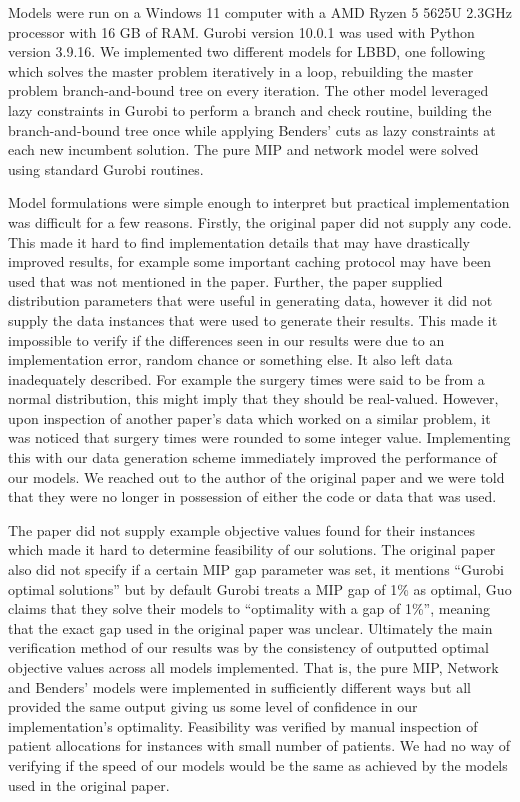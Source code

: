 Models were run on a Windows 11 computer with a AMD Ryzen 5 5625U 2.3GHz processor with 16 GB of RAM\@. Gurobi version 10.0.1 was used with Python version 3.9.16. We implemented two different models for LBBD, one following\cite{roshanaei2017propagating} which solves the master problem iteratively in a loop, rebuilding the master problem branch-and-bound tree on every iteration. The other model leveraged lazy constraints in Gurobi to perform a branch and check routine\cite{LBBDBible}, building the branch-and-bound tree once while applying Benders' cuts as lazy constraints at each new incumbent solution. The pure MIP and network model were solved using standard Gurobi routines. 

Model formulations were simple enough to interpret but practical implementation was difficult for a few reasons. Firstly, the original paper did not supply any code. This made it hard to find implementation details that may have drastically improved results, for example some important caching protocol may have been used that was not mentioned in the paper. Further, the paper supplied distribution parameters that were useful in generating data, however it did not supply the data instances that were used to generate their results. This made it impossible to verify if the differences seen in our results were due to an implementation error, random chance or something else. It also left data inadequately described. For example the surgery times were said to be from a normal distribution, this might imply that they should be real-valued. However, upon inspection of another paper's data which worked on a similar problem\cite{guo}, it was noticed that surgery times were rounded to some integer value. Implementing this with our data generation scheme immediately improved the performance of our models. We reached out to the author of the original paper and we were told that they were no longer in possession of either the code or data that was used. 

The paper did not supply example objective values found for their instances which made it hard to determine feasibility of our solutions. The original paper also did not specify if a certain MIP gap parameter was set, it mentions ``Gurobi optimal solutions'' but by default Gurobi treats a MIP gap of 1\% as optimal, Guo claims that they solve their models to ``optimality with a gap of 1\%'', meaning that the exact gap used in the original paper was unclear. Ultimately the main verification method of our results was by the consistency of outputted optimal objective values across all models implemented. That is, the pure MIP, Network and Benders' models were implemented in sufficiently different ways but all provided the same output giving us some level of confidence in our implementation's optimality. Feasibility was verified by manual inspection of patient allocations for instances with small number of patients. We had no way of verifying if the speed of our models would be the same as achieved by the models used in the original paper.

